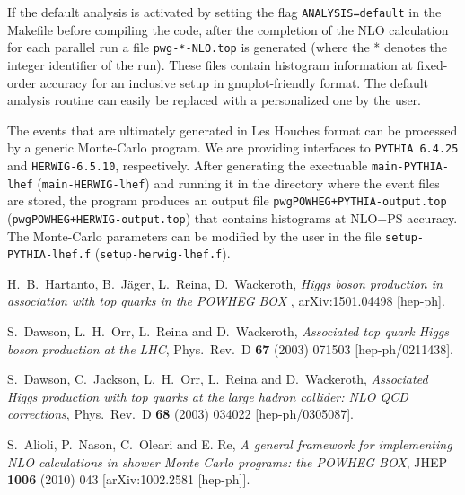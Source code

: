 \documentclass[a4paper,11pt]{article}
\newcommand\PYTHIA{{\tt PYTHIA}}
\begin{document}
If the default analysis is activated by setting the flag 
{\tt ANALYSIS=default} in the Makefile before compiling the code, after the completion of the NLO calculation for each parallel run a file {\tt  pwg-*-NLO.top} is generated (where the * denotes the integer
identifier of the run). These files contain histogram information at fixed-order accuracy for an inclusive setup in gnuplot-friendly format. The default analysis routine can easily be replaced with a personalized one by the user.  

The events that are ultimately generated in Les Houches format can be processed by a generic Monte-Carlo program. We are providing interfaces to \PYTHIA~{\tt 6.4.25}  and {\tt HERWIG-6.5.10}, respectively. After generating the exectuable {\tt main-PYTHIA-lhef} ({\tt main-HERWIG-lhef}) and running it in the directory where the event files are stored, the program produces an output file {\tt pwgPOWHEG+PYTHIA-output.top} ({\tt pwgPOWHEG+HERWIG-output.top}) that contains histograms at NLO+PS accuracy. The Monte-Carlo parameters can be modified by the user in the file {\tt setup-PYTHIA-lhef.f} ({\tt setup-herwig-lhef.f}). 

%
\begin{thebibliography}{99}

 H.~B.~Hartanto, B.~J\"ager, L.~Reina, D.~Wackeroth, {\em Higgs boson production in association with top quarks in the POWHEG BOX }, arXiv:1501.04498 [hep-ph]. 

  S.~Dawson, L.~H.~Orr, L.~Reina and D.~Wackeroth,
  {\em Associated top quark Higgs boson production at the LHC},
  Phys.\ Rev.\ D {\bf 67} (2003) 071503
  [hep-ph/0211438]. 
  
  S.~Dawson, C.~Jackson, L.~H.~Orr, L.~Reina and D.~Wackeroth,
  {\em Associated Higgs production with top quarks at the large hadron collider: NLO QCD corrections}, 
  Phys.\ Rev.\ D {\bf 68} (2003) 034022
  [hep-ph/0305087].

 S.~Alioli, P.~Nason, C.~Oleari and E. Re, {\em
    A general framework for implementing NLO calculations in shower
    Monte Carlo programs: the POWHEG BOX}, JHEP {\bf 1006} (2010)
  043  [arXiv:1002.2581 [hep-ph]].

\end{thebibliography}
\end{document}
